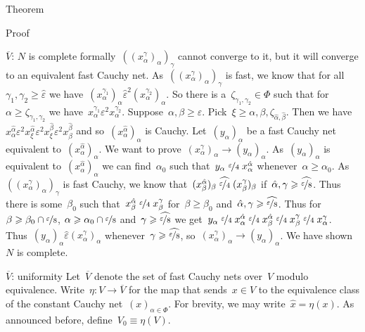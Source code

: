 \documentclass[b]{subfiles}
\begin{document}
\begin{parsec}
\begin{point}{Theorem}
\begin{point}{Proof}
\begin{point}{$\overline{V}$: $N$ is complete}
    formally~$((x^\gamma_\alpha)_\alpha)_\gamma$
    cannot converge to it,
    but it will converge to an equivalent fast Cauchy net.
As~$((x^\gamma_\alpha)_\alpha)_\gamma$
    is fast,
    we know that for all~$\gamma_1,\gamma_2 \geq \hat\varepsilon$
we have~$
(x^{\gamma_1}_\alpha)_\alpha \mathrel{\hat\varepsilon^2}
        (x^{\gamma_2}_\alpha)_\alpha$.
So there is a~$\zeta_{\gamma_1,\gamma_2} \in \Phi$
such that for~$\alpha \geq \zeta_{\gamma_1,\gamma_2}$
    we have~$x^{\gamma_1}_\alpha
        \mathrel{\varepsilon^2}
        x^{\gamma_2}_\alpha$.
Suppose~$\alpha,\beta \geq \varepsilon$.
Pick~$\xi \geq \alpha,\beta,\zeta_{\hat\alpha,\hat\beta}$.
Then we have $ x^{\hat{\alpha}}_\alpha
            \mathrel{\varepsilon^2}
        x^{\hat{\alpha}}_\xi
            \mathrel{\varepsilon^2}
        x^{\hat{\beta}}_\xi
            \mathrel{\varepsilon^2}
            x^{\hat{\beta}}_\beta$ and so~$(x_\alpha^{\hat\alpha})_\alpha$
            is Cauchy.
Let~$(y_\alpha)_\alpha$ be a fast Cauchy net equivalent
to~$(x^{\hat\alpha}_\alpha)_\alpha$.
We want to prove~$(x^\gamma_\alpha)_\alpha \to (y_\alpha)_\alpha$.
As~$(y_\alpha)_\alpha$ is equivalent to~$(x^{\hat\alpha}_\alpha)_\alpha$
    we can find~$\alpha_0$
    such that~$y_\alpha \mathrel{\nicefrac{\varepsilon}{4}} x^{\hat\alpha}_\alpha$
    whenever~$\alpha \geq \alpha_0$.
As~$((x^\gamma_\alpha)_\alpha)_\gamma$
is fast Cauchy,
we know that~$(x^{\hat\alpha}_\beta)_\beta
\mathrel{\widehat{\nicefrac{\varepsilon}{4}}}
(x^\gamma_\beta)_\beta $
if~$\hat{\alpha}, \gamma \geq \widehat{\nicefrac{\varepsilon}{8}}$.
Thus there is some~$\beta_0$ such
that~$x^{\hat\alpha}_\beta
\mathrel{\nicefrac{\varepsilon}{4}}
x^\gamma_\beta $
for~$\beta \geq \beta_0$
and~$\hat{\alpha}, \gamma \geq \widehat{\nicefrac{\varepsilon}{8}}$.
Thus for~$\beta \geq \beta_0 \cap \nicefrac{\varepsilon}{8}$,
$\alpha \geq \alpha_0 \cap \nicefrac{\varepsilon}{8}$
and~$\gamma \geq \widehat{\nicefrac{\varepsilon}{8}}$
we get~$y_\alpha
\mathrel{\nicefrac{\varepsilon}{4}}
x^{\hat{\alpha}}_\alpha
\mathrel{\nicefrac{\varepsilon}{4}}
x^{\hat{\alpha}}_\beta
\mathrel{\nicefrac{\varepsilon}{4}}
x^\gamma_\beta
\mathrel{\nicefrac{\varepsilon}{4}}
x^\gamma_\alpha$.
Thus~$(y_\alpha)_\alpha \mathrel{\hat\varepsilon} (x^\gamma_\alpha)_\alpha$
whenever~$\gamma \geq \widehat{\nicefrac{\varepsilon}{8}}$,
so~$(x^\gamma_\alpha)_\alpha \to (y_\alpha)_\alpha$.
We have shown~$N$ is complete.
\end{point}
\begin{point}{$\overline{V}$: uniformity}%
Let~$\overline{V}$ denote the set of fast Cauchy nets over~$V$
    modulo equivalence.
Write~$\eta\colon V \to \overline{V}$
for the map that sends~$x \in V$
to the equivalence class of the constant Cauchy net~$(x)_{\alpha \in \Phi}$.
For brevity, we may write~$\hat{x} = \eta(x)$.
As announced before, define~$V_0 \equiv \eta(V)$.


\end{point}
\end{point}
\end{point}
\end{parsec}
\end{document}
